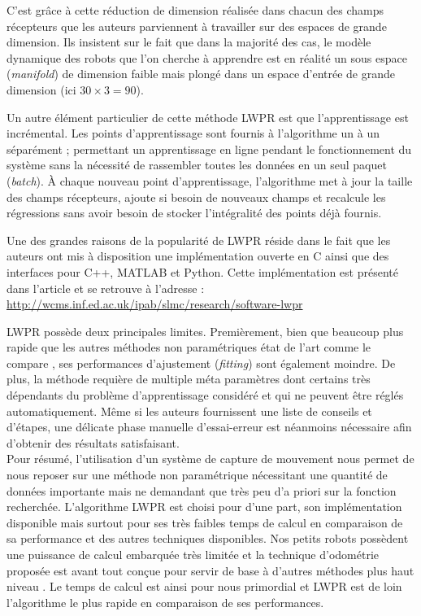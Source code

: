 C'est grâce à cette réduction de dimension réalisée dans chacun des 
champs récepteurs que les auteurs parviennent à travailler sur des espaces 
de grande dimension.
Ils insistent sur le fait que dans la majorité des cas, le modèle dynamique des robots 
que l'on cherche à apprendre est en réalité un sous espace (\textit{manifold}) 
de dimension faible mais plongé dans un espace d'entrée 
de grande dimension (ici $30\times3=90$).

Un autre élément particulier de cette méthode LWPR est que l'apprentissage est incrémental.
Les points d'apprentissage sont fournis à l'algorithme un à un séparément ; 
permettant un apprentissage \og en ligne \fg pendant le fonctionnement du système
sans la nécessité de rassembler toutes les données en un seul paquet (\textit{batch}).
À chaque nouveau point d'apprentissage, l'algorithme met à jour 
la taille des champs récepteurs, ajoute si besoin de nouveaux champs 
et recalcule les régressions sans avoir besoin de stocker l'intégralité
des points déjà fournis.

Une des grandes raisons de la popularité de LWPR réside dans le fait que les auteurs ont 
mis à disposition une implémentation ouverte en C ainsi que des interfaces pour C++, MATLAB et Python. 
Cette implémentation est présenté dans l'article \cite{klanke_library_2008} et se retrouve
à l'adresse : \url{http://wcms.inf.ed.ac.uk/ipab/slmc/research/software-lwpr}

LWPR possède deux principales limites. 
Premièrement, bien que beaucoup plus rapide que les autres méthodes non paramétriques 
état de l'art comme le compare \cite{nguyen-tuong_model_2009},
ses performances d'ajustement (\textit{fitting}) sont également moindre.
De plus, la méthode requière de multiple méta paramètres dont certains très dépendants 
du problème d'apprentissage considéré et qui ne peuvent être réglés automatiquement.
Même si les auteurs fournissent une liste de conseils et d'étapes, une délicate 
phase manuelle d'essai-erreur est néanmoins nécessaire afin d'obtenir 
des résultats satisfaisant.\\

Pour résumé, l'utilisation d'un système de capture de mouvement nous permet
de nous reposer sur une méthode non paramétrique nécessitant une quantité de données
importante mais ne demandant que très peu d'a priori sur la fonction recherchée.
L'algorithme LWPR est choisi pour d'une part, son implémentation 
disponible mais surtout pour ses très faibles temps de calcul en comparaison 
de sa performance et des autres techniques disponibles.
Nos petits robots possèdent une puissance de calcul embarquée 
très limitée et la technique d'odométrie proposée est avant tout conçue 
pour servir de base à d'autres méthodes plus \og haut niveau \fg.
Le temps de calcul est ainsi pour nous primordial et LWPR est de loin 
l'algorithme le plus rapide en comparaison de ses performances.

